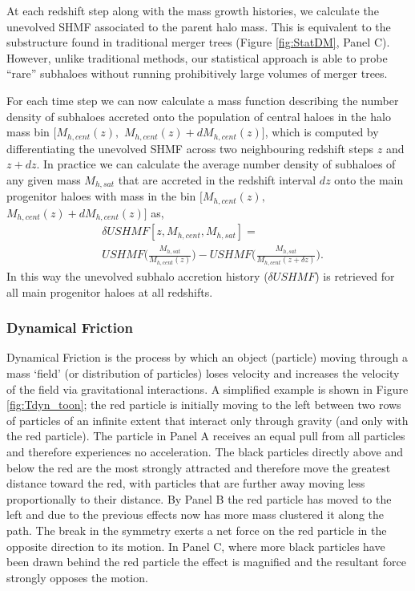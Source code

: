 At each redshift step along with the mass growth histories, we calculate the unevolved SHMF associated to the parent halo mass. This is equivalent to the substructure found in traditional merger trees (Figure \ref{fig:StatDM}, Panel C). However, unlike traditional methods, our statistical approach is able to probe ``rare'' subhaloes without running prohibitively large volumes of merger trees.

For each time step we can now calculate a mass function describing the number density of subhaloes accreted onto the population of central haloes in the halo mass bin $[M_{h,cent}(z),$ $M_{h,cent}(z) + dM_{h,cent}(z)]$, which is computed by differentiating the unevolved SHMF across two neighbouring redshift steps $z$ and $z+dz$. In practice we can calculate the average number density of subhaloes of any given mass $M_{h, sat}$ that are accreted in the redshift interval $dz$ onto the main progenitor haloes with mass in the bin $[M_{h,cent}(z),$ $M_{h,cent}(z) + dM_{h,cent}(z)]$ as,
\begin{equation}
\label{eqn:deltSHMF}
\begin{split}
&\delta USHMF[z, M_{h,cent},M_{h,sat}] =  \\
&USHMF\Big(\frac{M_{h,sat}}{M_{h,cent}(z)}\Big) - USHMF\Big(\frac{M_{h,sat}}{M_{h,cent}(z + \delta z)}\Big).
\end{split}
\end{equation}
In this way the unevolved subhalo accretion history ($\delta USHMF$) is retrieved for all main progenitor haloes at all redshifts.

\subsubsection{Dynamical Friction}
\label{subsub:DynF}
Dynamical Friction is the process by which an object (particle) moving through a mass `field' (or distribution of particles) loses velocity and increases the velocity of the field via gravitational interactions. A simplified example is shown in Figure \ref{fig:Tdyn_toon}; the red particle is initially moving to the left between two rows of particles of an infinite extent that interact only through gravity (and only with the red particle). The particle in Panel A receives an equal pull from all particles and therefore experiences no acceleration. The black particles directly above and below the red are the most strongly attracted and therefore move the greatest distance toward the red, with particles that are further away moving less proportionally to their distance. By Panel B the red particle has moved to the left and due to the previous effects now has more mass clustered it along the path. The break in the symmetry exerts a net force on the red particle in the opposite direction to its motion. In Panel C, where more black particles have been drawn behind the red particle the effect is magnified and the resultant force strongly opposes the motion. 

